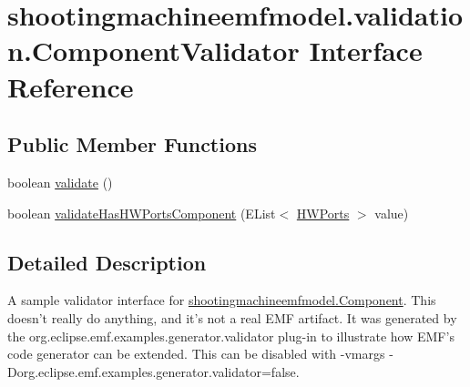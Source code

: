 \hypertarget{interfaceshootingmachineemfmodel_1_1validation_1_1_component_validator}{\section{shootingmachineemfmodel.\-validation.\-Component\-Validator Interface Reference}
\label{interfaceshootingmachineemfmodel_1_1validation_1_1_component_validator}
}
\subsection*{Public Member Functions}
\begin{DoxyCompactItemize}
\item 
boolean \hyperlink{interfaceshootingmachineemfmodel_1_1validation_1_1_component_validator_af928d64ea60f47967c2502b0d1013e4d}{validate} ()
\item 
boolean \hyperlink{interfaceshootingmachineemfmodel_1_1validation_1_1_component_validator_a1bc0a27508bdf6a7a5662d8d459078df}{validate\-Has\-H\-W\-Ports\-Component} (E\-List$<$ \hyperlink{interfaceshootingmachineemfmodel_1_1_h_w_ports}{H\-W\-Ports} $>$ value)
\end{DoxyCompactItemize}


\subsection{Detailed Description}
A sample validator interface for \hyperlink{interfaceshootingmachineemfmodel_1_1_component}{shootingmachineemfmodel.\-Component}. This doesn't really do anything, and it's not a real E\-M\-F artifact. It was generated by the org.\-eclipse.\-emf.\-examples.\-generator.\-validator plug-\/in to illustrate how E\-M\-F's code generator can be extended. This can be disabled with -\/vmargs -\/\-Dorg.\-eclipse.\-emf.\-examples.\-generator.\-validator=false. 

